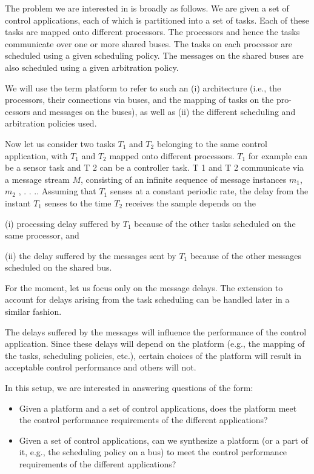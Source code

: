 

The problem we are interested in is broadly as follows. We are given a set
of control applications, each of which is partitioned into a set of tasks. Each of
these tasks are mapped onto different processors. The processors and hence the
tasks communicate over one or more shared buses. The tasks on each processor
are scheduled using a given scheduling policy. The messages on the shared buses
are also scheduled using a given arbitration policy.

We will use the term platform to refer to such an (i) architecture (i.e., the
processors, their connections via buses, and the mapping of tasks on the pro-
cessors and messages on the buses), as well as (ii) the different scheduling and
arbitration policies used.

Now let us consider two tasks $T_1$ and $T_2$ belonging to the same control
application, with $T_1$ and $T_2$ mapped onto different processors. $T_1$ for example
can be a sensor task and T 2 can be a controller task. T 1 and T 2 communicate
via a message stream $M$, consisting of an infinite sequence of message instances
$m_1$, $m_2$ , . . .. Assuming that $T_1$ senses at a constant periodic rate, the delay
from the instant $T_1$ senses to the time $T_2$ receives the sample depends on the

(i) processing delay suffered by $T_1$ because of the other tasks scheduled on the
same processor, and 

(ii) the delay suffered by the messages sent by $T_1$ because
of the other messages scheduled on the shared bus.

For the moment, let us focus only on the message delays. The extension to
account for delays arising from the task scheduling can be handled later in a
similar fashion.

The delays suffered by the messages will influence the performance of the
control application. Since these delays will depend on the platform (e.g., the
mapping of the tasks, scheduling policies, etc.), certain choices of the platform
will result in acceptable control performance and others will not.

In this setup, we are interested in answering questions of the form:
\begin{itemize}
 \item Given a platform and a set of control applications, does the platform meet
the control performance requirements of the different applications?
 \item  Given a set of control applications, can we synthesize a platform (or a part
of it, e.g., the scheduling policy on a bus) to meet the control performance
requirements of the different applications?
\end{itemize}

